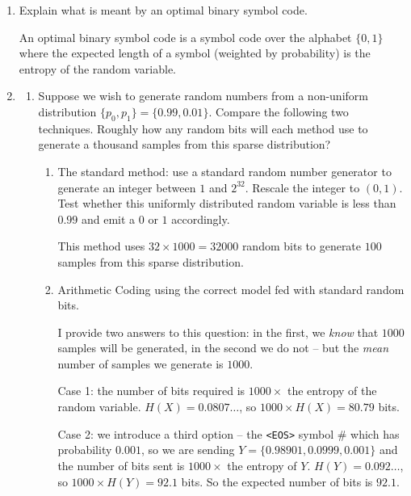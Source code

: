 \documentclass[10pt,\jkfside,a4paper]{article}
\begin{document}
\begin{enumerate}

    \item Explain what is meant by an optimal binary symbol code.

    An optimal binary symbol code is a symbol code over the alphabet $\{0, 1\}$ where the expected length of a symbol (weighted by probability) is the entropy of the random variable.

    \item

    \begin{enumerate}

        \item Suppose we wish to generate random numbers from a non-uniform distribution $\{p_0, p_1\} = \{0.99, 0.01\}$. Compare the following two techniques. Roughly how any random bits will each method use to
        generate a thousand samples from this sparse distribution?

        \begin{enumerate}

            \item The standard method: use a standard random number generator to generate an integer between $1$ and $2^{32}$. Rescale the integer to $(0, 1)$. Test whether this uniformly distributed random
            variable is less than $0.99$ and emit a $0$ or $1$ accordingly.

            This method uses $32 \times 1000 = 32000$ random bits to generate $100$ samples from this sparse distribution.

            \item Arithmetic Coding using the correct model fed with standard random bits.

            I provide two answers to this question: in the first, we \textit{know} that $1000$ samples will be generated, in the second we do not -- but the \textit{mean} number of samples we generate is $1000$.

            Case 1: the number of bits required is $1000\times$ the entropy of the random variable. $H(X) = 0.0807\ldots$, so $1000 \times H(X) = 80.79$ bits.

            Case 2: we introduce a third option -- the \texttt{<EOS>} symbol $\#$ which has probability $0.001$, so we are sending $Y = \{0.98901, 0.0999, 0.001\}$ and the number of bits sent is $1000\times$ the
            entropy of $Y$. $H(Y) = 0.092\ldots$, so $1000 \times H(Y) = 92.1$ bits. So the expected number of bits is $92.1$.


\end{enumerate}
\end{enumerate}
\end{enumerate}
\end{document}
